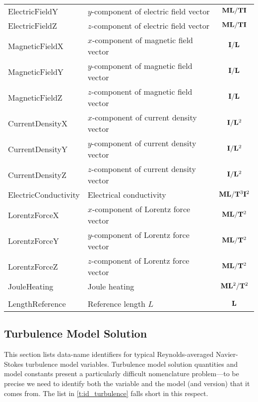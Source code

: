 \begin{longtable}{>{\ttfamily}l >{\raggedright\arraybackslash}p{\Pwidth} c}
ElectricFieldY       & $y$-component of electric field vector  &
   ${\bf M} {\bf L}/{\bf T} {\bf I}$ \\
ElectricFieldZ       & $z$-component of electric field vector  &
   ${\bf M} {\bf L}/{\bf T} {\bf I}$ \\
MagneticFieldX       & $x$-component of magnetic field vector  &
   ${\bf I}/{\bf L}$ \\
MagneticFieldY       & $y$-component of magnetic field vector  &
   ${\bf I}/{\bf L}$ \\
MagneticFieldZ       & $z$-component of magnetic field vector  &
   ${\bf I}/{\bf L}$ \\
CurrentDensityX      & $x$-component of current density vector &
   ${\bf I}/{\bf L}^2$ \\
CurrentDensityY      & $y$-component of current density vector &
   ${\bf I}/{\bf L}^2$ \\
CurrentDensityZ      & $z$-component of current density vector &
   ${\bf I}/{\bf L}^2$ \\
ElectricConductivity & Electrical conductivity                 &
   ${\bf M} {\bf L}/{\bf T}^3 {\bf I}^2$ \\
LorentzForceX        & $x$-component of Lorentz force vector   &
   ${\bf M} {\bf L}/{\bf T}^2$ \\
LorentzForceY        & $y$-component of Lorentz force vector   &
   ${\bf M} {\bf L}/{\bf T}^2$ \\
LorentzForceZ        & $z$-component of Lorentz force vector   &
   ${\bf M} {\bf L}/{\bf T}^2 $ \\
JouleHeating         & Joule heating                           &
   ${\bf M} {\bf L}^2/{\bf T}^2$ \\
\\
LengthReference         & Reference length $L$ &
   ${\bf L}$
\end{longtable}

\newpage
\subsection{Turbulence Model Solution}

This section lists data-name identifiers for typical Reynolds-averaged
Navier-Stokes turbulence model variables.
Turbulence model solution quantities and model constants present a
particularly difficult nomenclature problem---to be precise we need to
identify both the variable and the model (and version) that it comes
from.
The list in \autoref{t:id_turbulence} falls short in this respect.

